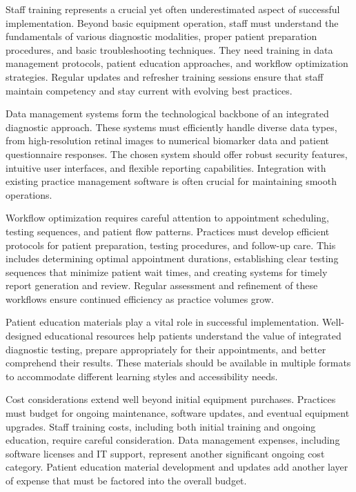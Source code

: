 \documentclass[
  Letterpaper,
]{scrbook}
\begin{document}
Staff training represents a crucial yet often underestimated aspect of
successful implementation. Beyond basic equipment operation, staff must
understand the fundamentals of various diagnostic modalities, proper
patient preparation procedures, and basic troubleshooting techniques.
They need training in data management protocols, patient education
approaches, and workflow optimization strategies. Regular updates and
refresher training sessions ensure that staff maintain competency and
stay current with evolving best practices.

Data management systems form the technological backbone of an integrated
diagnostic approach. These systems must efficiently handle diverse data
types, from high-resolution retinal images to numerical biomarker data
and patient questionnaire responses. The chosen system should offer
robust security features, intuitive user interfaces, and flexible
reporting capabilities. Integration with existing practice management
software is often crucial for maintaining smooth operations.

Workflow optimization requires careful attention to appointment
scheduling, testing sequences, and patient flow patterns. Practices must
develop efficient protocols for patient preparation, testing procedures,
and follow-up care. This includes determining optimal appointment
durations, establishing clear testing sequences that minimize patient
wait times, and creating systems for timely report generation and
review. Regular assessment and refinement of these workflows ensure
continued efficiency as practice volumes grow.

Patient education materials play a vital role in successful
implementation. Well-designed educational resources help patients
understand the value of integrated diagnostic testing, prepare
appropriately for their appointments, and better comprehend their
results. These materials should be available in multiple formats to
accommodate different learning styles and accessibility needs.

Cost considerations extend well beyond initial equipment purchases.
Practices must budget for ongoing maintenance, software updates, and
eventual equipment upgrades. Staff training costs, including both
initial training and ongoing education, require careful consideration.
Data management expenses, including software licenses and IT support,
represent another significant ongoing cost category. Patient education
material development and updates add another layer of expense that must
be factored into the overall budget.
\end{document}
